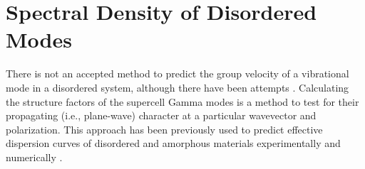 



\section{\label{Appendix:SF}Spectral Density of Disordered Modes}

There is not an 
accepted method to predict the group velocity of a 
vibrational mode in a disordered system, although there have been 
attempts 
\cite{cahill_lattice_1988,duda_reducing_2011,
donadio_atomistic_2009,he_heat_2011,he_thermal_2011,hori_phonon_2013}. 
Calculating the structure factors of the supercell Gamma   
modes is a method to test for their propagating (i.e., plane-wave)  
character at a particular wavevector and 
polarization. This approach has been previously used to predict 
effective dispersion curves of disordered and amorphous materials 
experimentally
\cite{benassi_evidence_1996,sette_dynamics_1998,
ruocco_relaxation_2000,ruocco_high-frequency_2001,
ruzicka_evidence_2004,
baldi_thermal_2008,baldi_sound_2010,kaya_normal_2010,
green_density_2011,baldi_emergence_2013}  
and 
numerically 
\cite{biswas_vibrational_1988,feldman_thermal_1993,
allen_diffusons_1999,feldman_numerical_1999,
taraskin_determination_1999,taraskin_propagation_2000,
volz_molecular-dynamics_2000,
gotze_evolution_2000,horbach_high_2001,
martin-mayor_dynamical_2001,feldman_calculations_2002,
ciliberti_brillouin_2003,christie_vibrational_2007,
shintani_universal_2008,wyart_scaling_2010,
beltukov_ioffe-regel_2013,larkin_predicting_2013,
marruzzo_heterogeneous_2013}. 

